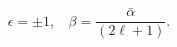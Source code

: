 \begin{equation}                              
\epsilon = \pm{1},~~~~\beta=\frac{\bar{\alpha}}{(2 \ell + 1)}.                              
\end{equation} 
